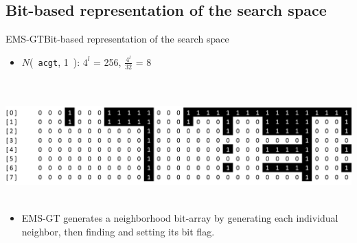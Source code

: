 \documentclass[pdf,xcolor={dvipsnames}]{beamer}
\begin{document}
	\subsection{Bit-based representation of the search space}
	\begin{frame}{EMS-GT}{Bit-based representation of the search space}
		\begin{itemize}
			\item $N$(\ \texttt{acgt}, 1\ ): $4^l$ = 256, $\frac{4^l}{32}$ = 8
		\end{itemize}\ \\\ \\
		
		{ \centering\includegraphics[width=\textwidth]{img/acgt_labeled.png}\\ }
		\ \\
		\begin{itemize}
			\item EMS-GT generates a neighborhood bit-array by generating each individual neighbor, then finding and setting its bit flag.
		\end{itemize}
		\end{frame}
\end{document}
